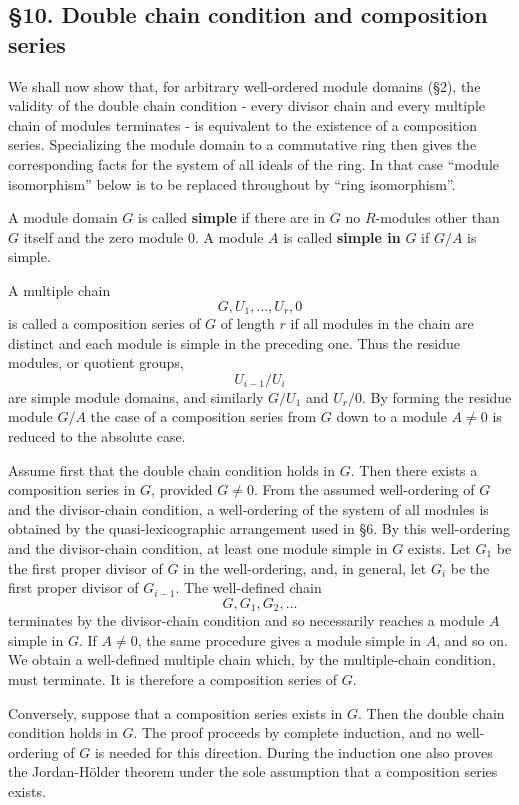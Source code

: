 \documentclass[
  12pt,
]{article}
\begin{document}
\subsection{§10. Double chain condition and composition
series}\label{double-chain-condition-and-composition-series}

We shall now show that, for arbitrary well-ordered module domains (§2),
the validity of the double chain condition - every divisor chain and
every multiple chain of modules terminates - is equivalent to the
existence of a composition series. Specializing the module domain to a
commutative ring then gives the corresponding facts for the system of
all ideals of the ring. In that case ``module isomorphism'' below is to
be replaced throughout by ``ring isomorphism''.

A module domain \(G\) is called \textbf{simple} if there are in \(G\) no
\(R\)-modules other than \(G\) itself and the zero module \(0\). A
module \(A\) is called \textbf{simple in} \(G\) if \(G/A\) is simple.

A multiple chain \[
  G,U_1,
\ldots,U_r,0
\] is called a composition series of \(G\) of length \(r\) if all
modules in the chain are distinct and each module is simple in the
preceding one. Thus the residue modules, or quotient groups, \[
  U_{i-1}/U_i
\] are simple module domains, and similarly \(G/U_1\) and \(U_r/0\). By
forming the residue module \(G/A\) the case of a composition series from
\(G\) down to a module \(A\ne0\) is reduced to the absolute case.

Assume first that the double chain condition holds in \(G\). Then there
exists a composition series in \(G\), provided \(G\ne0\). From the
assumed well-ordering of \(G\) and the divisor-chain condition, a
well-ordering of the system of all modules is obtained by the
quasi-lexicographic arrangement used in §6. By this well-ordering and
the divisor-chain condition, at least one module simple in \(G\) exists.
Let \(G_1\) be the first proper divisor of \(G\) in the well-ordering,
and, in general, let \(G_i\) be the first proper divisor of \(G_{i-1}\).
The well-defined chain \[
  G,G_1,G_2,
\ldots
\] terminates by the divisor-chain condition and so necessarily reaches
a module \(A\) simple in \(G\). If \(A\ne0\), the same procedure gives a
module simple in \(A\), and so on. We obtain a well-defined multiple
chain which, by the multiple-chain condition, must terminate. It is
therefore a composition series of \(G\).

Conversely, suppose that a composition series exists in \(G\). Then the
double chain condition holds in \(G\). The proof proceeds by complete
induction, and no well-ordering of \(G\) is needed for this direction.
During the induction one also proves the Jordan-Hölder theorem under the
sole assumption that a composition series exists.
\end{document}
